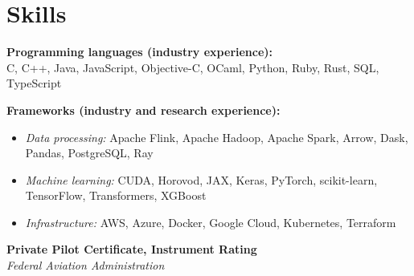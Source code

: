 \section*{Skills}

\textbf{Programming languages (industry experience):} \\
C, C++, Java, JavaScript, Objective-C, OCaml, Python, Ruby, Rust, SQL, TypeScript

\textbf{Frameworks (industry and research experience):}
\begin{itemize}
    \item \emph{Data processing:} Apache Flink, Apache Hadoop, Apache Spark, Arrow, Dask, Pandas, PostgreSQL, Ray
    \item \emph{Machine learning:} CUDA, Horovod, JAX, Keras, PyTorch, scikit-learn, TensorFlow, Transformers, XGBoost
    \item \emph{Infrastructure:} AWS, Azure, Docker, Google Cloud, Kubernetes, Terraform
\end{itemize}

\textbf{Private Pilot Certificate, Instrument Rating} \\
\emph{Federal Aviation Administration}